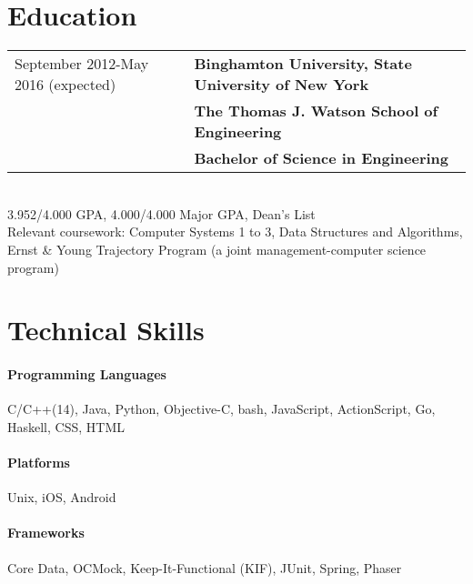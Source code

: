 \documentclass[letterpaper,10pt]{article} %
\begin{document}
\pagestyle{empty} %

\par{\par} %
\par{\par}
\par{\par}

\section{Education}
\begin{tabular}{@{}p{3in}l}
    September 2012-May 2016 (expected) & \textbf{Binghamton University, State University of New York} \\
    & \textbf{The Thomas J. Watson School of Engineering} \\
    & \textbf{Bachelor of Science in Engineering}
\end{tabular} \\
3.952/4.000 GPA, 4.000/4.000 Major GPA, Dean's List \\
Relevant coursework: Computer Systems 1 to 3, Data Structures and Algorithms,
Ernst \& Young Trajectory Program {\footnotesize (a joint management-computer science program)}

\section{Technical Skills}

\paragraph{Programming Languages} C/C++(14), Java, Python, Objective-C,
    {\footnotesize bash, JavaScript, ActionScript, Go, Haskell, CSS, HTML}
\paragraph{Platforms} Unix, iOS, Android
\paragraph{Frameworks} Core Data, OCMock, Keep-It-Functional (KIF), JUnit, {\footnotesize Spring, Phaser}
\end{document}
